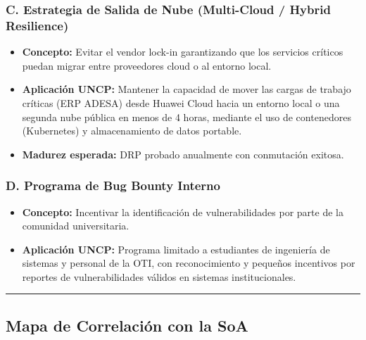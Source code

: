 \documentclass[10pt,letterpaper]{article}
\begin{document}
\subsubsection{C. Estrategia de Salida de Nube (Multi-Cloud / Hybrid
Resilience)}\label{c.-estrategia-de-salida-de-nube-multi-cloud-hybrid-resilience}

\begin{itemize}
\tightlist
\item
  \textbf{Concepto:} Evitar el vendor lock-in garantizando que los
  servicios críticos puedan migrar entre proveedores cloud o al entorno
  local.
\item
  \textbf{Aplicación UNCP:} Mantener la capacidad de mover las cargas de
  trabajo críticas (ERP ADESA) desde Huawei Cloud hacia un entorno local
  o una segunda nube pública en menos de 4 horas, mediante el uso de
  contenedores (Kubernetes) y almacenamiento de datos portable.
\item
  \textbf{Madurez esperada:} DRP probado anualmente con conmutación
  exitosa.
\end{itemize}

\subsubsection{D. Programa de Bug Bounty
Interno}\label{d.-programa-de-bug-bounty-interno}

\begin{itemize}
\tightlist
\item
  \textbf{Concepto:} Incentivar la identificación de vulnerabilidades
  por parte de la comunidad universitaria.
\item
  \textbf{Aplicación UNCP:} Programa limitado a estudiantes de
  ingeniería de sistemas y personal de la OTI, con reconocimiento y
  pequeños incentivos por reportes de vulnerabilidades válidos en
  sistemas institucionales.
\end{itemize}

\begin{center}\rule{0.5\linewidth}{0.5pt}\end{center}

\subsection{Mapa de Correlación con la
SoA}\label{mapa-de-correlaciuxf3n-con-la-soa}
\end{document}
